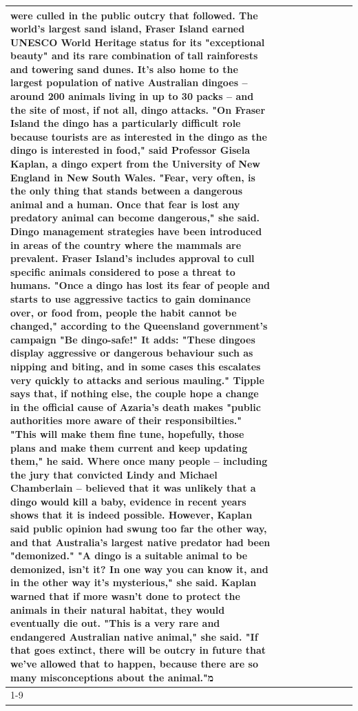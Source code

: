 \begin{table}[H]
\begin{tabular}{lllrlllll}
were culled in the public outcry that followed. The world's largest sand island, Fraser Island earned UNESCO World Heritage status for its "exceptional beauty" and its rare combination of tall rainforests and towering sand dunes. It's also home to the largest population of native Australian dingoes -- around 200 animals living in up to 30 packs -- and the site of most, if not all, dingo attacks. "On Fraser Island the dingo has a particularly difficult role because tourists are as interested in the dingo as the dingo is interested in food," said Professor Gisela Kaplan, a dingo expert from the University of New England in New South Wales. "Fear, very often, is the only thing that stands between a dangerous animal and a human. Once that fear is lost any predatory animal can become dangerous," she said. Dingo management strategies have been introduced in areas of the country where the mammals are prevalent. Fraser Island's includes approval to cull specific animals considered to pose a threat to humans. "Once a dingo has lost its fear of people and starts to use aggressive tactics to gain dominance over, or food from, people the habit cannot be changed," according to the Queensland government's campaign "Be dingo-safe!" It adds: "These dingoes display aggressive or dangerous behaviour such as nipping and biting, and in some cases this escalates very quickly to attacks and serious mauling." Tipple says that, if nothing else, the couple hope a change in the official cause of Azaria's death makes "public authorities more aware of their responsibilties." "This will make them fine tune, hopefully, those plans and make them current and keep updating them," he said. Where once many people -- including the jury that convicted Lindy and Michael Chamberlain -- believed that it was unlikely that a dingo would kill a baby, evidence in recent years shows that it is indeed possible. However, Kaplan said public opinion had swung too far the other way, and that Australia's largest native predator had been "demonized." "A dingo is a suitable animal to be demonized, isn't it? In one way you can know it, and in the other way it's mysterious," she said. Kaplan warned that if more wasn't done to protect the animals in their natural habitat, they would eventually die out. "This is a very rare and endangered Australian native animal," she said. "If that goes extinct, there will be outcry in future that we've allowed that to happen, because there are so many misconceptions about the animal."מ \\
\cline{1-9}

\end{tabular}
\end{table}
